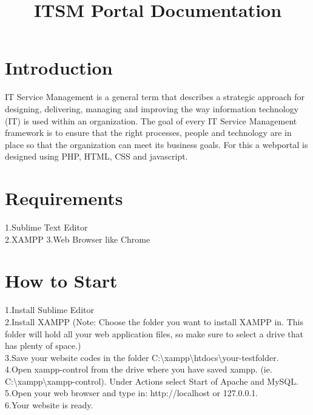 \documentclass{article}
\begin{document}
\title{ITSM Portal Documentation}
\date{}

\maketitle
\tableofcontents
\newpage



\section{Introduction}
IT Service Management is a general term that describes a strategic approach for designing, delivering, managing and improving the way information technology (IT) is used within an organization. The goal of every IT Service Management framework is to ensure that the right processes, people and technology are in place so that the organization can meet its business goals. For this a webportal is designed using PHP, HTML, CSS and javascript.

\section{Requirements}
\begin{singlespace}
1.Sublime Text Editor   \\
2.XAMPP \linebreak
3.Web Browser like Chrome \end{singlespace}

\section{How to Start}
\begin{singlespace}
1.Install Sublime Editor\\ 
2.Install XAMPP
(Note: Choose the folder you want to install XAMPP in. This folder will hold all your web application files, so make sure to select a drive that has plenty of space.)\\
3.Save your website codes in the folder C:\textbackslash xampp\textbackslash htdocs\textbackslash your-testfolder.\\
4.Open xampp-control from the drive where you have saved xampp. (ie. C:\textbackslash xampp\textbackslash xampp-control). Under Actions select Start of Apache and MySQL.\\
5.Open your web browser and type in: http://localhost or 127.0.0.1.\\
6.Your website is ready.
\end{singlespace}
\end{document}
